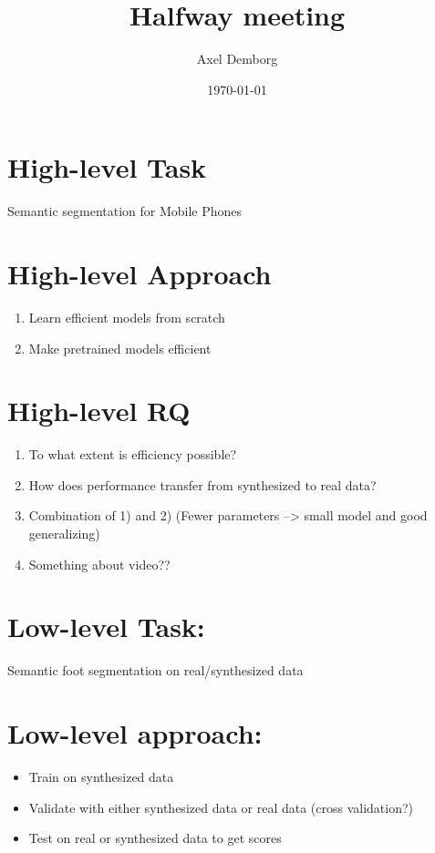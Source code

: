 \documentclass[11pt]{article}
\author{Axel Demborg}
\date{\today}
\title{Halfway meeting}
\begin{document}
\maketitle

\section{High-level Task}
\label{sec:org8aea82c}
Semantic segmentation for Mobile Phones

\section{High-level Approach}
\label{sec:org8d24f1f}
\begin{enumerate}
\item Learn efficient models from scratch
\item Make pretrained models efficient
\end{enumerate}

\section{High-level RQ}
\label{sec:org2bd2f8d}
\begin{enumerate}
\item To what extent is efficiency possible?
\item How does performance transfer from synthesized to real data?
\item Combination of 1) and 2) (Fewer parameters --> small model and good generalizing)
\item Something about video??
\end{enumerate}

\section{Low-level Task:}
\label{sec:org07b3ee4}
Semantic foot segmentation on real/synthesized data

\section{Low-level approach:}
\label{sec:org2880b77}
\begin{itemize}
\item Train on synthesized data
\item Validate with either synthesized data or real data (cross validation?)
\item Test on real or synthesized data to get scores
\end{itemize}
\end{document}
